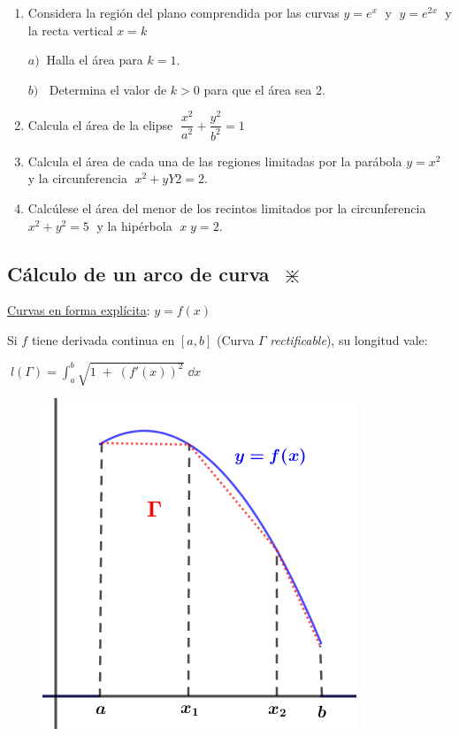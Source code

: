 \begin{enumerate}
\item Considera la región del plano comprendida por las curvas $y=e^x\;$ y $\; y=e^{2x}\; $ y la recta vertical $x=k$

\hspace{10mm}$a)\; \; $Halla el área para $k=1$.

\hspace{10mm}$b)\; \;$ Determina el valor de $k>0$ para que el área sea 2.


\item Calcula el área de la elipse $\; \dfrac{x^2}{a^2}+\dfrac{y^2}{b^2}=1 \;$

\rightline{\textcolor{gris}{Solución: $A=\pi\; a \; b$}}

\item Calcula el área de cada una de las regiones limitadas por la parábola $y=x^2\; $ y la circunferencia $\; x^2+yY2=2$.

\rightline{\textcolor{gris}{Solución: $a) \quad \pi/2+2/3; \qquad b) \quad 3\pi/2-2/3$}}

\item Calcúlese el área del menor de los recintos limitados por la circunferencia $x^2+y^2=5\; $ y la hipérbola $\; x\; y = 2$. 

\end{enumerate}


\subsection{Cálculo de un arco de curva $\; \divideontimes $}

		


\underline{Curvas en forma explícita}: $y=f(x)$

Si $f$ tiene derivada continua en $[a,b]$ (Curva $\Gamma$ \emph{rectificable}), su longitud vale:

\hspace{20mm} $\boxed{\; \displaystyle l(\Gamma)=\int_a^b \sqrt{1\; + \; (f'(x))^2}\; \dd x\; }$

	\begin{figure}[H]
	\centering
	\includegraphics[width=.45\textwidth]{imagenes/imagenes08/T08IM21.png}
	\end{figure}


